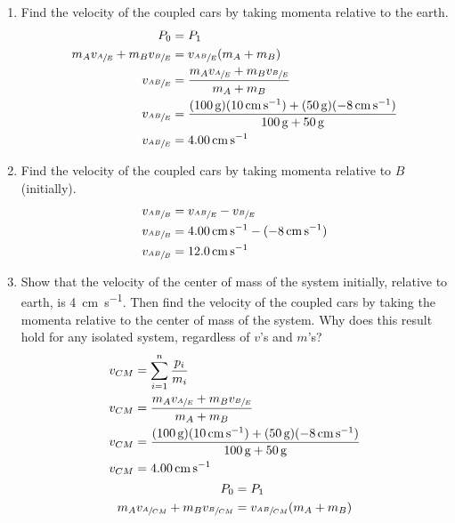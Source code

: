 \documentclass{article}
\begin{document}
\begin{enumerate}[label = \textbf{(\alph*)}]
	\item Find the velocity of the coupled cars by taking momenta relative to the earth.
		\begin{align*}
			P_0 & = P_1 \\
			m_Av_{\sfrac{A}{E}} + m_Bv_{\sfrac{B}{E}} & = v_{\sfrac{AB}{E}}(m_A + m_B) \\
			v_{\sfrac{AB}{E}} & = \frac{ m_Av_{\sfrac{A}{E}} + m_Bv_{\sfrac{B}{E}} }{ m_A + m_B } \\
			v_{\sfrac{AB}{E}} & = \frac{ (\SI{100}{\gram})(\SI{10}{\centi \meter \per \second}) + (\SI{50}{\gram})(\SI{-8}{\centi \meter \per \second}) }{ \SI{100}{\gram} + \SI{50}{\gram} } \\
			v_{\sfrac{AB}{E}} & = \SI{4.00}{\centi \meter \per \second}
		\end{align*}
	\item Find the velocity of the coupled cars by taking momenta relative to $ B $ (initially).
		\begin{align*}
			v_{\sfrac{AB}{B}} & = v_{\sfrac{AB}{E}} - v_{\sfrac{B}{E}} \\
			v_{\sfrac{AB}{B}} & = \SI{4.00}{\centi \meter \per \second} - (\SI{-8}{\centi \meter \per \second}) \\
			v_{\sfrac{AB}{B}} & = \SI{12.0}{\centi \meter \per \second}
		\end{align*}
	\item \label{975.c} Show that the velocity of the center of mass of the system initially, relative to earth, is \SI{+4}{\centi \meter \per \second}. Then find the velocity of the coupled cars by taking the momenta relative to the center of mass of the system. Why does this result hold for any isolated system, regardless of $ v $'s and $ m $'s?
		\begin{align*}
			v_{CM} & = \sum_{i = 1}^{n} \frac{ p_i }{ m_i } \\
			v_{CM} & = \frac{ m_Av_{\sfrac{A}{E}} + m_Bv_{\sfrac{B}{E}} }{ m_A + m_B } \\
			v_{CM} & = \frac{ (\SI{100}{\gram})(\SI{10}{\centi \meter \per \second}) + (\SI{50}{\gram})(\SI{-8}{\centi \meter \per \second}) }{ \SI{100}{\gram} + \SI{50}{\gram} } \\
			v_{CM} & = \SI{4.00}{\centi \meter \per \second}
		\end{align*}
		\begin{align*}
			P_0 & = P_1 \\
			m_Av_{\sfrac{A}{CM}} + m_Bv_{\sfrac{B}{CM}} & = v_{\sfrac{AB}{CM}}(m_A + m_B) \\

\end{align*}
\end{enumerate}
\end{document}
